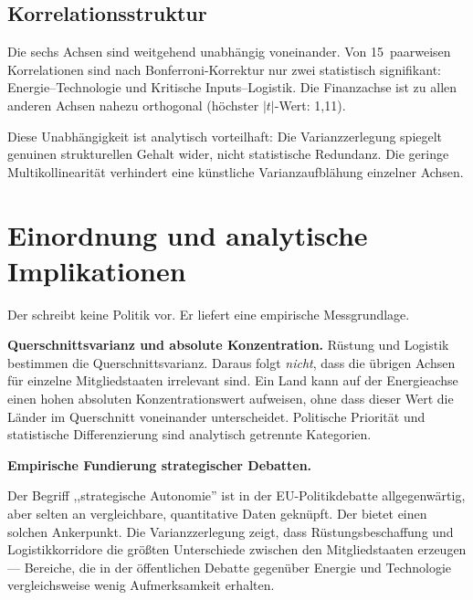 \subsection{Korrelationsstruktur}

\begin{sloppypar}
Die sechs Achsen sind weitgehend unabh\"angig voneinander.  Von
15~paarweisen Korrelationen sind nach Bonferroni-Korrektur nur
zwei statistisch signifikant: Energie--Technologie und Kritische
Inputs--Logistik.  Die Finanzachse ist zu allen anderen Achsen
nahezu orthogonal (h\"ochster $|t|$-Wert: 1{,}11).
\end{sloppypar}

Diese Unabh\"angigkeit ist analytisch vorteilhaft: Die
Varianzzerlegung spiegelt genuinen strukturellen Gehalt wider,
nicht statistische Redundanz.  Die geringe
Multikollinearit\"at verhindert eine k\"unstliche
Varianzaufbl\"ahung einzelner Achsen.


\section{Einordnung und analytische Implikationen}
\label{sec:implikationen}

Der \ISI schreibt keine Politik vor.  Er liefert eine empirische
Messgrundlage.

\begin{sloppypar}
\textbf{Querschnitts\-varianz und absolute Konzentration.}
R\"ustung und Logistik bestimmen die Querschnitts\-varianz.  Daraus
folgt \emph{nicht}, dass die \"ubrigen Achsen f\"ur einzelne
Mitgliedstaaten irrelevant sind.  Ein Land kann auf der
Energieachse einen hohen absoluten Konzentrations\-wert aufweisen,
ohne dass dieser Wert die L\"ander im Querschnitt voneinander
unterscheidet.  Politische Priorit\"at und statistische
Differenzierung sind analytisch getrennte Kategorien.
\end{sloppypar}

\textbf{Empirische Fundierung strategischer Debatten.}
\begin{sloppypar}
Der Begriff ,,strategische Autonomie'' ist in der
EU-Politikdebatte allgegenw\"artig, aber selten an vergleichbare,
quantitative Daten gekn\"upft.  Der \ISI bietet einen solchen
Ankerpunkt.  Die Varianz\-zerlegung zeigt, dass
R\"ustungs\-beschaffung und Logistik\-korridore die gr\"o\ss ten
Unterschiede zwischen den Mitgliedstaaten erzeugen --- Bereiche,
die in der \"offentlichen Debatte gegen\"uber Energie und
Technologie vergleichsweise wenig Aufmerksamkeit erhalten.
\end{sloppypar}

